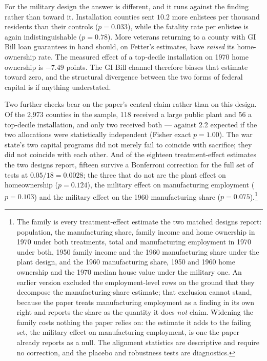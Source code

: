 \documentclass[12pt]{article}
\begin{document}
For the military design the answer is different, and it runs against the
finding rather than toward it. Installation counties sent $10.2$ more enlistees
per thousand residents than their controls ($p = 0.033$), while the fatality
rate per enlistee is again indistinguishable ($p = 0.78$). More veterans
returning to a county with GI Bill loan guarantees in hand should, on Fetter's
estimates, have \emph{raised} its home-ownership rate. The measured effect of a
top-decile installation on 1970 home ownership is $-7.49$ points. The GI Bill
channel therefore biases that estimate toward zero, and the structural
divergence between the two forms of federal capital is if anything understated.

Two further checks bear on the paper's central claim rather than on this
design. Of the 2{,}973 counties in the sample, 118 received a large public
plant and 56 a top-decile installation, and only two received both --- against
2.2 expected if the two allocations were statistically independent (Fisher
exact $p = 1.00$). The war state's two capital programs did not merely fail
to coincide with sacrifice; they did not coincide with each other. And of the
eighteen treatment-effect estimates the two designs report, fifteen survive a
Bonferroni correction for the full set of tests at $0.05/18 = 0.0028$; the three
that do not are the plant effect on homeownership ($p = 0.124$), the military
effect on manufacturing employment ($p = 0.103$) and the military
effect on the 1960 manufacturing share ($p = 0.075$).\footnote{The family is every treatment-effect estimate the two matched designs report: population, the manufacturing share, family income and home ownership in 1970 under both treatments, total and manufacturing employment in 1970 under both, 1950 family income and the 1960 manufacturing share under the plant design, and the 1960 manufacturing share, 1950 and 1960 home ownership and the 1970 median house value under the military one. An earlier version excluded the employment-level rows on the ground that they decompose the manufacturing-share estimate; that exclusion cannot stand, because the paper treats manufacturing employment as a finding in its own right and reports the share as the quantity it does \emph{not} claim. Widening the family costs nothing the paper relies on: the estimate it adds to the failing set, the military effect on manufacturing employment, is one the paper already reports as a null. The alignment statistics are descriptive and require no correction, and the placebo and robustness tests are diagnostics.}
\end{document}

